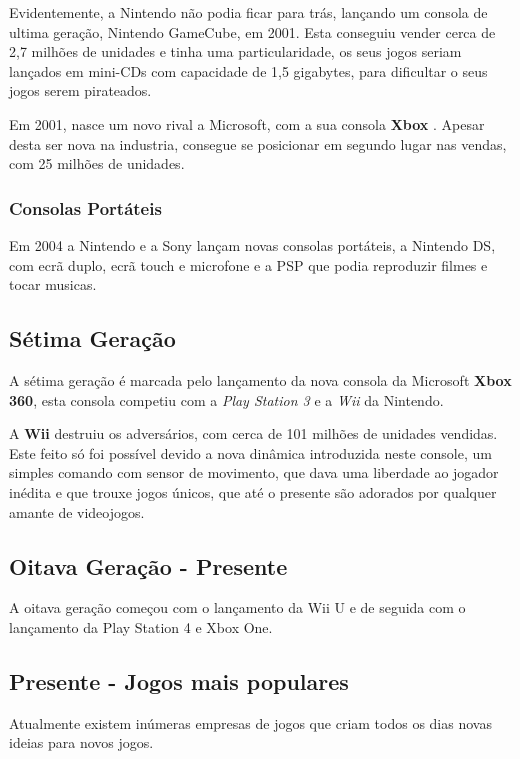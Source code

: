 \documentclass{report}
\begin{document}
Evidentemente, a Nintendo não podia ficar para trás, lançando um consola de ultima geração, Nintendo GameCube, em 2001. Esta conseguiu vender cerca de 2,7 milhões de unidades e tinha uma particularidade, os seus jogos seriam lançados em mini-CDs com capacidade de 1,5 gigabytes, para dificultar o seus jogos serem pirateados.

Em 2001, nasce um novo rival a Microsoft, com a sua consola \textbf{Xbox} \cite{XBox}. Apesar desta ser nova na industria, consegue se posicionar em segundo lugar nas vendas, com 25 milhões de unidades.

\subsubsection{Consolas Portáteis}
\label{subsub.consolas Portateis}
Em 2004 a Nintendo e a Sony lançam novas consolas portáteis, a Nintendo DS, com ecrã duplo, ecrã touch e microfone e a PSP que podia reproduzir filmes e tocar musicas.

\subsection{Sétima Geração}
\label{sub.setima geraçao}
A sétima geração é marcada pelo lançamento da nova consola da Microsoft \textbf{Xbox 360}, esta consola competiu com a \textit{Play Station 3} e a \textit{Wii} da Nintendo.

A \textbf{Wii} destruiu os adversários, com cerca de  101 milhões de unidades vendidas. Este feito só foi possível devido a nova dinâmica introduzida neste console, um simples comando com sensor de movimento, que dava uma liberdade ao jogador inédita e que trouxe jogos únicos, que até o presente são adorados por qualquer amante de videojogos.


\subsection{Oitava Geração - Presente}
\label{sub.Oitava Geraçao - Presente}
A oitava geração começou com o lançamento da Wii U e de seguida com o lançamento da  Play Station 4 e Xbox One.

\subsection{Presente - Jogos mais populares}
\label{sub.Presente - Jogos mais populares}
Atualmente existem inúmeras empresas de jogos que criam todos os dias novas ideias para novos jogos.
 
\end{document}
